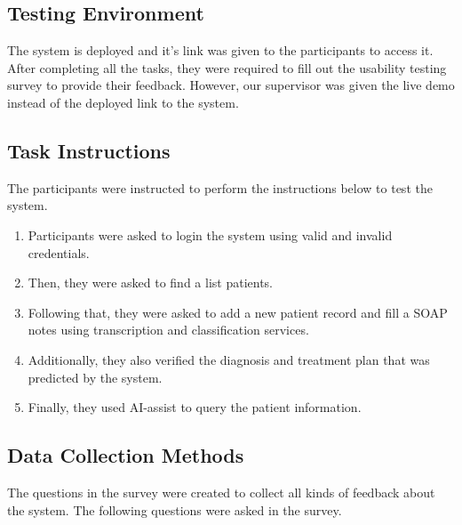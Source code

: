 \documentclass{article}
\begin{document}
\subsection{Testing Environment}

The system is deployed and it's link was given to the participants to access it. After completing all the tasks, they were required to fill out the usability testing survey to provide their feedback. However, our supervisor was given the live demo instead of the deployed link to the system.

\subsection{Task Instructions}

The participants were instructed to perform the instructions below to test the system.

\begin{enumerate}
    \item Participants were asked to login the system using valid and invalid credentials.
    \item Then, they were asked to find a list patients.
    \item Following that, they were asked to add a new patient record and fill a SOAP notes using transcription and classification services.
    \item Additionally, they also verified the diagnosis and treatment plan that was predicted by the system.
    \item Finally, they used AI-assist to query the patient information.
\end{enumerate}

\subsection{Data Collection Methods}

The questions in the survey were created to collect all kinds of feedback about the system. The following questions were asked in the survey.
\end{document}
